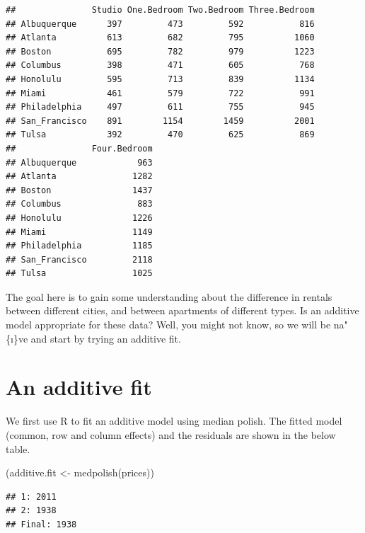 \documentclass[
]{book}
\newenvironment{Shaded}{\begin{snugshade}}{\end{snugshade}}
\newcommand{\FunctionTok}[1]{\textcolor[rgb]{0.00,0.00,0.00}{#1}}
\newcommand{\NormalTok}[1]{#1}
\newcommand{\OtherTok}[1]{\textcolor[rgb]{0.56,0.35,0.01}{#1}}
\begin{document}
\begin{verbatim}
##               Studio One.Bedroom Two.Bedroom Three.Bedroom
## Albuquerque      397         473         592           816
## Atlanta          613         682         795          1060
## Boston           695         782         979          1223
## Columbus         398         471         605           768
## Honolulu         595         713         839          1134
## Miami            461         579         722           991
## Philadelphia     497         611         755           945
## San_Francisco    891        1154        1459          2001
## Tulsa            392         470         625           869
##               Four.Bedroom
## Albuquerque            963
## Atlanta               1282
## Boston                1437
## Columbus               883
## Honolulu              1226
## Miami                 1149
## Philadelphia          1185
## San_Francisco         2118
## Tulsa                 1025
\end{verbatim}

The goal here is to gain some understanding about the difference in rentals between different cities, and between apartments of different types. Is an additive model appropriate for these data? Well, you might not know, so we will be na"\{\i\}ve and start by trying an additive fit.

\hypertarget{an-additive-fit}{%
\section{An additive fit}\label{an-additive-fit}}

We first use R to fit an additive model using median polish. The fitted model (common, row and column effects) and the residuals are shown in the below table.

\begin{Shaded}
\begin{Highlighting}[]
\NormalTok{(additive.fit }\OtherTok{\textless{}{-}} \FunctionTok{medpolish}\NormalTok{(prices))}
\end{Highlighting}
\end{Shaded}

\begin{verbatim}
## 1: 2011
## 2: 1938
## Final: 1938
\end{verbatim}
\end{document}
